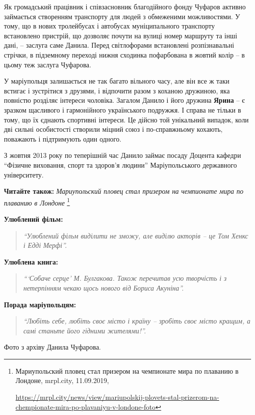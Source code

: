 
Як громадський працівник і співзасновник благодійного фонду Чуфаров активно
займається створенням транспорту для людей з обмеженими можливостями. У тому,
що в нових тролейбусах і автобусах муніципального транспорту встановлено
пристрій, що дозволяє почути на вулиці номер маршруту та інші дані, – заслуга
саме Данила. Перед світлофорами встановлені розпізнавальні стрічки, в
підземному переході нижня сходинка пофарбована в жовтий колір – в цьому теж
заслуга Чуфарова.

У маріупольця залишається не так багато вільного часу, але він все ж таки
встигає і зустрітися з друзями, і відпочити разом з коханою дружиною, яка
повністю розділяє інтереси чоловіка. Загалом Данило і його дружина \textbf{Ярина} – є
зразком щасливого і гармонійного українського подружжя. І справа не тільки в
тому, що їх єднають спортивні інтереси. Це дійсно той унікальний випадок, коли
дві сильні особистості створили міцний союз і по-справжньому кохають, поважають
і підтримують один одного.


З жовтня 2013 року по теперішній час Данило займає посаду Доцента кафедри
\enquote{Фізичне виховання, спорт та здоров'я людини} Маріупольського
державного університету.

\textbf{Читайте також:} \emph{Мариупольский пловец стал призером на чемпионате мира по плаванию в Лондоне}%
\footnote{Мариупольский пловец стал призером на чемпионате мира по плаванию в Лондоне, mrpl.city, 11.09.2019, \par%
\url{https://mrpl.city/news/view/mariupolskij-plovets-stal-prizerom-na-chempionate-mira-po-plavaniyu-v-londone-foto}
}

\textbf{Улюблений фільм:} 

\begin{quote}
\em\enquote{Улюблений фільм виділити не зможу, але виділю акторів – це
Том Хенкс і Едді Мерфі}.
\end{quote}

\textbf{Улюблена книга:} 

\begin{quote}
\em\enquote{\enquote{Собаче серце} М. Булгакова. Також перечитав усю творчість і з
нетерпінням чекаю щось нового від Бориса Акуніна}.
\end{quote}

\textbf{Порада маріупольцям:} 

\begin{quote}
\em\enquote{Любіть себе, любіть своє місто і країну – зробіть своє
місто кращим, а самі станьте його гідними жителями!}.
\end{quote}

Фото з архіву Данила Чуфарова.

